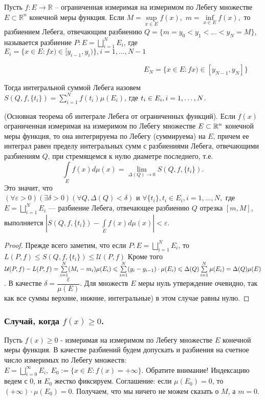 \begin{Def}
	Пусть $ f:E\to\mathbb{R} $ --  ограниченная измеримая на измеримом по Лебегу множестве $ E\subset\mathbb{R}^n $ конечной меры функция. Если $ M=\sup\limits_{x\in E}f(x), $ $ m=\inf\limits_{x\in E}f(x), $ то разбиением Лебега, отвечающим разбиению $ Q=\{m=y_0<y_1<\ldots <y_N=M\}, $ называется разбиение
	$ P: E=\bigsqcup\limits_{i=1}^{N}E_i$, где $E_i=\{x\in E: fx)\in [y_{i-1}, y_i)\}, i=1, \ldots, N-1$ 
	
	\ \ \ \ \ \ \ \ \ \ \ \ \ \ \ \ \ \ \ \ \ \ \ \ \ \ \ \ \ \ \  \ \ \ \ \ \ \ \ $E_N= \{x\in E: fx)\in [y_{N-1}, y_N]\}$
	
	Тогда интегральной суммой Лебега назовем $S(Q, f, \{t_i\})=\sum\limits_{i=1}^N f(t_i)\mu(E_i)$, где $t_i \in E_i, \newline i = 1, \ldots, N$.
\end{Def} 

\begin{theorem}(Основная теорема об интеграле Лебега от ограниченных функций).
	Если $f(x)$ ограниченная измеримая на измеримом по Лебегу множестве $ E\subset\R^n $ конечной меры  функция, то она интегрируема по Лебегу (суммируема) на $E$, причем ее интеграл равен пределу интегральных сумм с разбиениями Лебега, отвечающими разбиениям  $ Q $, при стремящемся к нулю диаметре последнего, т.е. $$\int\limits_E f(x)d\mu(x)=\lim_{\Delta(Q)\to 0}S(Q,f,\{t_i\}).$$
	Это значит, что $(\forall \varepsilon >0)(\exists \delta > 0)(\forall Q, \Delta(Q)<\delta) \text{ и } \forall \{t_i\}, t_i \in E_i, i=1,\ldots, N,$ где $E=\bigsqcup\limits_{i=1}^N E_i$ --- разбиение Лебега, отвечающее разбиению $Q$ отрезка $[m, M]$, выполняется $|S(Q, f, \{t_i\})-\int\limits_E f(x)d\mu(x)|<\varepsilon$.
\end{theorem}

\begin{proof}
	Прежде всего заметим, что если $P: E=\bigsqcup\limits_{i=1}^N E_i$, то\newline $L(P, f)\leqslant S(Q, f, \{t_i\})\leqslant \mathcal{U}(P, f)$ Кроме того $\mathcal{U}(P, f) - L(P, f) = \sum\limits_{i=1}^N(M_i-m_i)\mu(E_i) \?\leqslant \sum\limits_{i=1}^N (y_i-y_{i-1})\cdot\mu(E_i)\leqslant \Delta(Q) \sum\limits_{i=1}^N\mu(E_i)=\Delta(Q)\mu(E)$. В качестве $\delta = \dfrac{\varepsilon}{\mu(E)}$. Для множеств $ E $ меры нуль утверждение очевидно, так как все суммы верхние, нижние, интегральные) в этом случае равны нулю.
\end{proof}

\subsubsection{Случай, когда $f(x)\geqslant 0$.}
Пусть $f(x)\geqslant 0$ - измеримая на измеримом по Лебегу множестве $E$ конечной меры функция. В качестве разбиений будем допускать и разбиения на счетное число измеримых по Лебегу множеств: $E = \bigsqcup\limits_{i=0 }^{\infty}E_i,\ E_0:=\{x\in E:f(x)=+\infty\}$. Обратите внимание! Индексацию ведем с 0, и $E_0$ жестко фиксируем. Соглашение: если $\mu(E_0)=0$, то $(+\infty)\cdot \mu(E_0)=0$. Получаем, что мы ничего не можем сказать о $M$, а $m=0$. 

